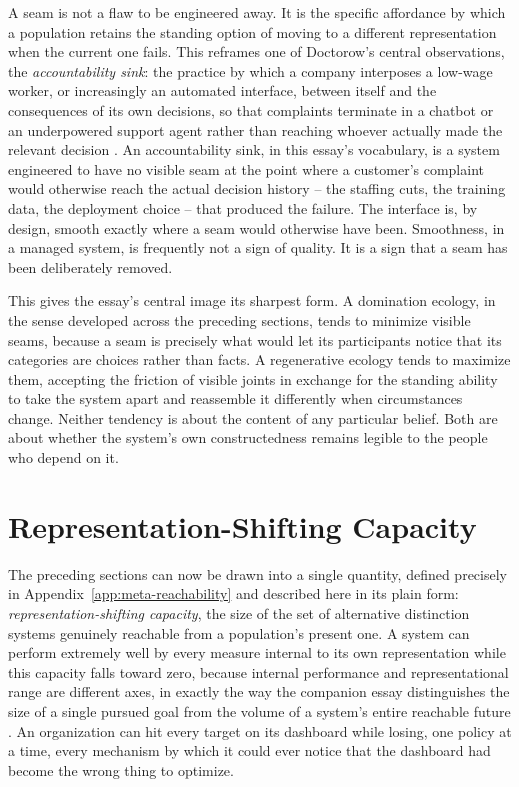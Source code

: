\documentclass[11pt]{article}
\theoremstyle{plain}
\begin{document}
A seam is not a flaw to be engineered away. It is the specific affordance by which a population retains the standing option of moving to a different representation when the current one fails. This reframes one of Doctorow's central observations, the \emph{accountability sink}: the practice by which a company interposes a low-wage worker, or increasingly an automated interface, between itself and the consequences of its own decisions, so that complaints terminate in a chatbot or an underpowered support agent rather than reaching whoever actually made the relevant decision \cite{doctorow2026}. An accountability sink, in this essay's vocabulary, is a system engineered to have no visible seam at the point where a customer's complaint would otherwise reach the actual decision history -- the staffing cuts, the training data, the deployment choice -- that produced the failure. The interface is, by design, smooth exactly where a seam would otherwise have been. Smoothness, in a managed system, is frequently not a sign of quality. It is a sign that a seam has been deliberately removed.

This gives the essay's central image its sharpest form. A domination ecology, in the sense developed across the preceding sections, tends to minimize visible seams, because a seam is precisely what would let its participants notice that its categories are choices rather than facts. A regenerative ecology tends to maximize them, accepting the friction of visible joints in exchange for the standing ability to take the system apart and reassemble it differently when circumstances change. Neither tendency is about the content of any particular belief. Both are about whether the system's own constructedness remains legible to the people who depend on it.

\section{Representation-Shifting Capacity}
\label{sec:representation-shifting}

The preceding sections can now be drawn into a single quantity, defined precisely in Appendix~\ref{app:meta-reachability} and described here in its plain form: \emph{representation-shifting capacity}, the size of the set of alternative distinction systems genuinely reachable from a population's present one. A system can perform extremely well by every measure internal to its own representation while this capacity falls toward zero, because internal performance and representational range are different axes, in exactly the way the companion essay distinguishes the size of a single pursued goal from the volume of a system's entire reachable future \cite{flyxion2026cone}. An organization can hit every target on its dashboard while losing, one policy at a time, every mechanism by which it could ever notice that the dashboard had become the wrong thing to optimize.
\end{document}
